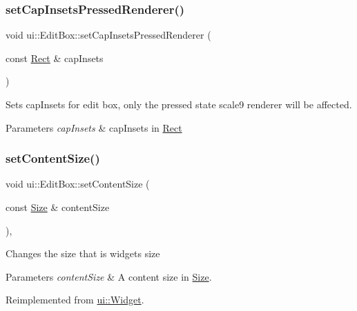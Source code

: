 \subsubsection{\texorpdfstring{set\+Cap\+Insets\+Pressed\+Renderer()}{setCapInsetsPressedRenderer()}}
{\footnotesize\ttfamily void ui\+::\+Edit\+Box\+::set\+Cap\+Insets\+Pressed\+Renderer (\begin{DoxyParamCaption}\item[{const \hyperlink{classRect}{Rect} \&}]{cap\+Insets }\end{DoxyParamCaption})}

Sets cap\+Insets for edit box, only the pressed state scale9 renderer will be affected.


\begin{DoxyParams}{Parameters}
{\em cap\+Insets} & cap\+Insets in \hyperlink{classRect}{Rect} \\
\hline
\end{DoxyParams}
\mbox{\label{classui_1_1EditBox_a1aadf938d146d0469da42e42d33e2a1e}} 
\subsubsection{\texorpdfstring{set\+Content\+Size()}{setContentSize()}\hspace{0.1cm}{\footnotesize\ttfamily [1/2]}}
{\footnotesize\ttfamily void ui\+::\+Edit\+Box\+::set\+Content\+Size (\begin{DoxyParamCaption}\item[{const \hyperlink{classSize}{Size} \&}]{content\+Size }\end{DoxyParamCaption})\hspace{0.3cm}{\ttfamily [override]}, {\ttfamily [virtual]}}

Changes the size that is widget\textquotesingle{}s size 
\begin{DoxyParams}{Parameters}
{\em content\+Size} & A content size in {\ttfamily \hyperlink{classSize}{Size}}. \\
\hline
\end{DoxyParams}


Reimplemented from \hyperlink{classui_1_1Widget_af5f35184ff3de275929e937f81a4ae30}{ui\+::\+Widget}.

\mbox{\label{classui_1_1EditBox_a3fbf590dff29ba873d9c72af308f7edd}} 
